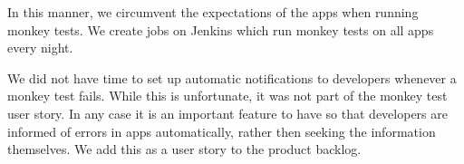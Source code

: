 In this manner, we circumvent the expectations of the apps when running monkey tests. We create jobs on Jenkins which run monkey tests on all apps every night.

We did not have time to set up automatic notifications to developers whenever a monkey test fails. While this is unfortunate, it was not part of the monkey test user story. In any case it is an important feature to have so that developers are informed of errors in apps automatically, rather then seeking the information themselves. We add this as a user story to the product backlog.